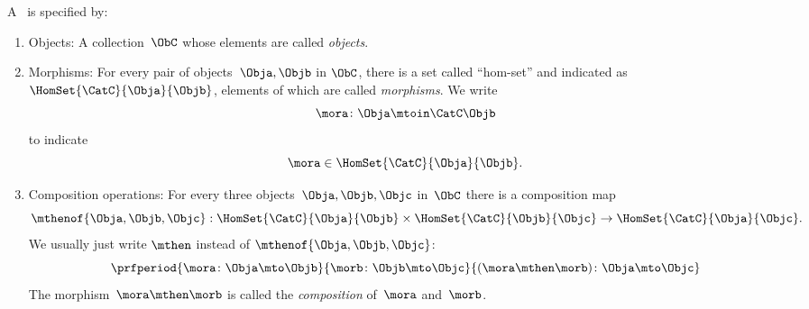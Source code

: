 \begin{ctdefinition}[Semicategory]
    \label{def:semicategory-compact}
    A \emph{}~\CatC is specified by:
    \begin{body}
        \constit
        \begin{enumerate}
            \item Objects: A collection\footnotemark~$\ObC$ whose elements are called \emph{objects}.
            \item Morphisms: For every pair of objects~$\Obja,\Objb$ in $\ObC$, there is a set called ``hom-set'' and indicated as~$\HomSet{\CatC}{\Obja}{\Objb}$, elements of which are called \emph{morphisms}.
                  We write
                  \begin{equation}
                      \mora \colon \Obja \mtoin\CatC \Objb
                  \end{equation}
                  to indicate
                  \begin{equation}
                      \mora \in \HomSet{\CatC}{\Obja}{\Objb}.
                  \end{equation}
            \item Composition operations: For every three objects~$\Obja,\Objb,\Objc$ in~$\ObC$ there is a composition map
                  \begin{equation}
                      \mthenof{\Obja,\Objb,\Objc}: \HomSet{\CatC}{\Obja}{\Objb} \times \HomSet{\CatC}{\Objb}{\Objc}\to \HomSet{\CatC}{\Obja}{\Objc}.
                  \end{equation}
                  We usually just write $\mthen$ instead of $\mthenof{\Obja,\Objb,\Objc}$:
                  \begin{equation}
                      \prfperiod{
                          \mora \colon \Obja \mto \Objb
                      }{
                          \morb\colon \Objb \mto \Objc
                      }{
                          (\mora \mthen \morb )\colon \Obja \mto \Objc
                      }
                  \end{equation}
                  The morphism~$\mora \mthen \morb$ is called the \emph{composition} of~$\mora$ and~$\morb$.
        \end{enumerate}

\end{body}
\end{ctdefinition}
